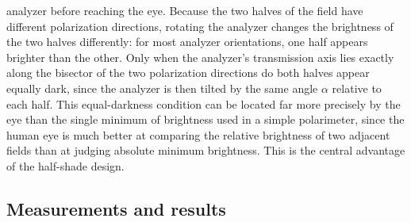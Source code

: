 analyzer before reaching the eye. Because the two halves of the field have
different polarization directions, rotating the analyzer changes the
brightness of the two halves differently: for most analyzer
orientations, one half appears brighter than the other. Only when the
analyzer's transmission axis lies exactly along the bisector of the two
polarization directions do both halves appear equally dark, since the analyzer is then tilted by the same
angle $\alpha$ relative to each half.
\noindent
This equal-darkness condition can be located far more precisely by the eye
than the single minimum of brightness used in a simple
polarimeter, since the human eye is much better at comparing the relative
brightness of two adjacent fields than at judging absolute minimum
brightness. This is the central advantage of the half-shade design.
    \subsection{Measurements and results}

